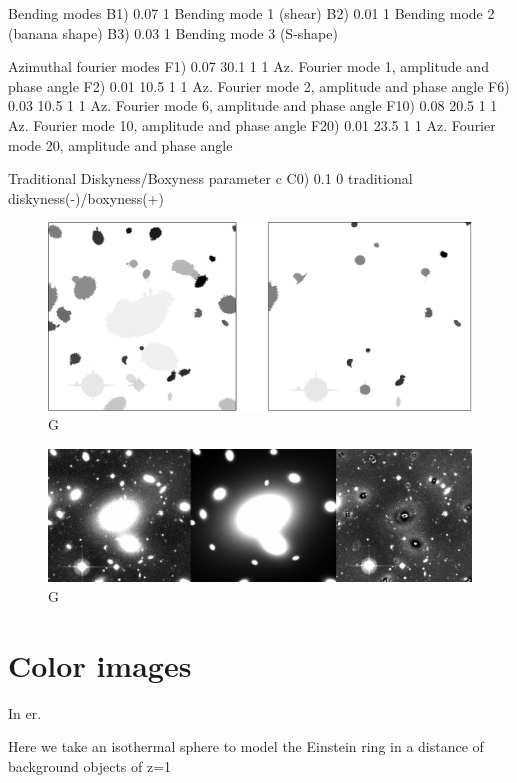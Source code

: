   Bending modes
B1)  0.07      1        Bending mode 1 (shear)
B2)  0.01      1        Bending mode 2 (banana shape)
B3)  0.03      1        Bending mode 3 (S-shape)

  Azimuthal fourier modes
F1)  0.07  30.1  1  1   Az. Fourier mode 1, amplitude and phase angle
F2)  0.01  10.5  1  1   Az. Fourier mode 2, amplitude and phase angle
F6)  0.03  10.5  1  1  Az. Fourier mode 6, amplitude and phase angle
F10)  0.08  20.5  1  1   Az. Fourier mode 10, amplitude and phase angle
F20)  0.01  23.5  1  1   Az. Fourier mode 20, amplitude and phase angle

  Traditional Diskyness/Boxyness parameter c
C0) 0.1         0       traditional diskyness(-)/boxyness(+)


\begin{figure}[H]
\centering
\includegraphics[width=12cm]{images/masks.png}
\caption[M]{G}
\end{figure}

\begin{figure}[H]
\centering
\includegraphics[width=15cm]{images/galfit.png}
\caption[M]{G}
\end{figure}

\section{Color images}


In er.  

Here we take an isothermal sphere to model the Einstein ring in a distance of background objects of z=1

